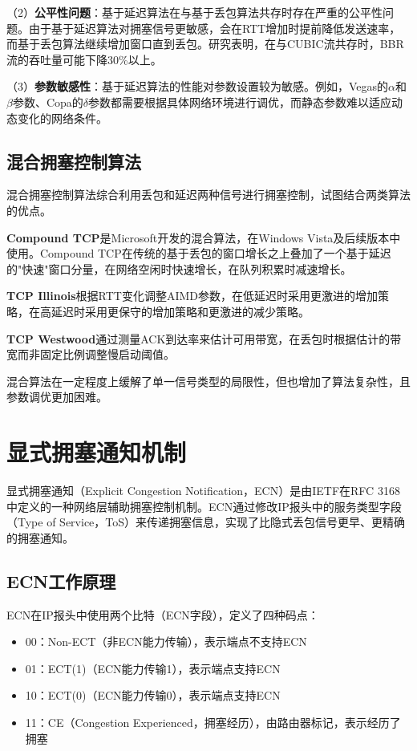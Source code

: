（2）\textbf{公平性问题}：基于延迟算法在与基于丢包算法共存时存在严重的公平性问题。由于基于延迟算法对拥塞信号更敏感，会在RTT增加时提前降低发送速率，而基于丢包算法继续增加窗口直到丢包。研究表明，在与CUBIC流共存时，BBR流的吞吐量可能下降30\%以上。

（3）\textbf{参数敏感性}：基于延迟算法的性能对参数设置较为敏感。例如，Vegas的$\alpha$和$\beta$参数、Copa的$\delta$参数都需要根据具体网络环境进行调优，而静态参数难以适应动态变化的网络条件。

\subsection{混合拥塞控制算法}

混合拥塞控制算法综合利用丢包和延迟两种信号进行拥塞控制，试图结合两类算法的优点。

\textbf{Compound TCP}是Microsoft开发的混合算法，在Windows Vista及后续版本中使用。Compound TCP在传统的基于丢包的窗口增长之上叠加了一个基于延迟的"快速"窗口分量，在网络空闲时快速增长，在队列积累时减速增长。

\textbf{TCP Illinois}根据RTT变化调整AIMD参数，在低延迟时采用更激进的增加策略，在高延迟时采用更保守的增加策略和更激进的减少策略。

\textbf{TCP Westwood}通过测量ACK到达率来估计可用带宽，在丢包时根据估计的带宽而非固定比例调整慢启动阈值。

混合算法在一定程度上缓解了单一信号类型的局限性，但也增加了算法复杂性，且参数调优更加困难。

\section{显式拥塞通知机制}

显式拥塞通知（Explicit Congestion Notification，ECN）是由IETF在RFC 3168中定义的一种网络层辅助拥塞控制机制。ECN通过修改IP报头中的服务类型字段（Type of Service，ToS）来传递拥塞信息，实现了比隐式丢包信号更早、更精确的拥塞通知。

\subsection{ECN工作原理}

ECN在IP报头中使用两个比特（ECN字段），定义了四种码点：

\begin{itemize}
    \item 00：Non-ECT（非ECN能力传输），表示端点不支持ECN
    \item 01：ECT(1)（ECN能力传输1），表示端点支持ECN
    \item 10：ECT(0)（ECN能力传输0），表示端点支持ECN
    \item 11：CE（Congestion Experienced，拥塞经历），由路由器标记，表示经历了拥塞
\end{itemize}

